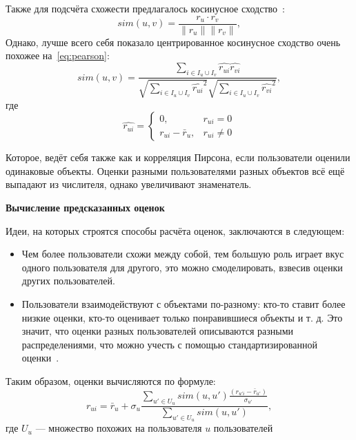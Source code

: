 Также для подсчёта схожести предлагалось косинусное сходство~\cite{breese}:
\begin{equation}\label{eq:cosine}
    sim(u, v) = \frac{r_u \cdot r_v}{\|r_u\| \| r_v\|{}},
\end{equation}
Однако, лучше всего себя показало центрированное косинусное сходство очень похожее на~\eqref{eq:pearson}:
\begin{equation}\label{eq:adjusted_cosine}
    sim(u, v) = \frac
    {\sum_{i \in I_u \cup I_v}{\hat{r_{ui}}\hat{r_{vi}}}}
    {\sqrt{\sum_{i \in I_u \cup I_v}{\hat{r_{ui}}^2}}
    \sqrt{\sum_{i \in I_u \cup I_v}{\hat{r_{vi}}^2}}},
\end{equation}
где
\begin{equation}
\hat{r_{ui}} =
\begin{cases}
    0, & r_{ui} = 0 \\
    r_{ui} - \bar r_{u}, & r_{ui} \neq 0
\end{cases}\label{eq:equation}
\end{equation}

Которое, ведёт себя также как и корреляция Пирсона, если пользователи оценили одинаковые объекты.
Оценки разными пользователями разных объектов всё ещё выпадают из числителя, однако увеличивают знаменатель.

\vspace{1em}
\textbf{Вычисление предсказанных оценок}

Идеи, на которых строятся способы расчёта оценок, заключаются в следующем:
\begin{itemize}
\item Чем более пользователи схожи между собой, тем большую роль играет вкус одного пользователя для другого, это можно смоделировать, взвесив оценки других пользователей.
\item Пользователи взаимодействуют с объектами по-разному: кто-то ставит более низкие оценки, кто-то оценивает только понравившиеся объекты и т. д.
Это значит, что оценки разных пользователей описываются разными распределениями, что можно учесть с помощью стандартизированной оценки~\cite{z-score}.
\end{itemize}

Таким образом, оценки вычисляются по формуле:
\begin{equation}\label{eq:z-score}
    r_{ui} = \bar r_u + \sigma_u \frac
    {\sum_{u' \in U_u}{sim(u, u')\frac{(r_{u'i} - \bar r_{u'})}{\sigma_{u'}}}}
    {\sum_{u' \in U_u}{sim(u, u')}},
\end{equation}
где $U_u$ --- множество похожих на пользователя $u$ пользователей

